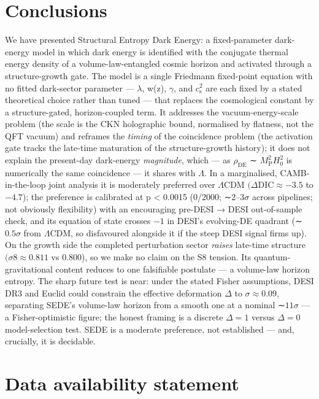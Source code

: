 \documentclass[preprint,12pt]{elsarticle}
\begin{document}
\section{Conclusions}\label{sec-10}

We have presented Structural Entropy Dark Energy: a fixed-parameter
dark-energy model in which dark energy is identified with the conjugate
thermal energy density of a volume-law-entangled cosmic horizon and
activated through a structure-growth gate. The model is a single
Friedmann fixed-point equation with no fitted dark-sector parameter ---
\(\lambda\), w(z), \(\gamma\), and \(c_{\mathrm{s}}^{2}\) are each fixed
by a stated theoretical choice rather than tuned --- that replaces the
cosmological constant by a structure-gated, horizon-coupled term. It
addresses the vacuum-energy-scale problem (the scale is the CKN
holographic bound, normalised by flatness, not the QFT vacuum) and
reframes the \emph{timing} of the coincidence problem (the activation
gate tracks the late-time maturation of the structure-growth history);
it does not explain the present-day dark-energy \emph{magnitude}, which
--- as \(\rho _\mathrm{DE}\) ∼ \(M_{\mathrm{P}}^{2}H_{0}^{2}\) is
numerically the same coincidence --- it shares with \(\Lambda\). In a
marginalised, CAMB-in-the-loop joint analysis it is moderately preferred
over \(\Lambda \mathrm{CDM}\) \((\Delta \mathrm{DIC} \approx  -3.5\) to
\(-4.7\)); the preference is calibrated at p \textless{} 0.0015 (0/2000;
∼2--\(3\sigma\) across pipelines; not obviously flexibility) with an
encouraging pre-DESI → DESI out-of-sample check, and its equation of
state crosses \(-1\) in DESI's evolving-DE quadrant (∼\(0.5\sigma\) from
\(\Lambda \mathrm{CDM}\), so disfavoured alongside it if the steep DESI
signal firms up). On the growth side the completed perturbation sector
\emph{raises} late-time structure \((\sigma 8 \approx  0.811\) vs
0.800), so we make no claim on the S8 tension. Its quantum-gravitational
content reduces to one falsifiable postulate --- a volume-law horizon
entropy. The sharp future test is near: under the stated Fisher
assumptions, DESI DR3 and Euclid could constrain the effective
deformation \(\Delta\) to \(\sigma  \approx  0.09\), separating SEDE's
volume-law horizon from a smooth one at a nominal ∼\(11\sigma\) --- a
Fisher-optimistic figure; the honest framing is a discrete
\(\Delta  = 1\) versus \(\Delta  = 0\) model-selection test. SEDE is a
moderate preference, not established --- and, crucially, it is
decidable.

\section*{Data availability
statement}\label{data-availability-statement}
\end{document}
